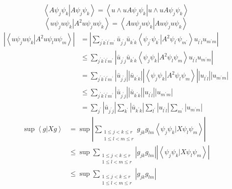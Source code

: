 \documentclass[aps,preprint]{revtex4}%
\begin{document}
\begin{equation}
\left\langle A\psi_{j}\psi_{k}\left\vert A\psi_{j}\psi_{k}\right.
\right\rangle =\left\langle u\wedge uA\psi_{j}\psi_{k}\left\vert u\wedge
uA\psi_{j}\psi_{k}\right.  \right\rangle
\end{equation}%
\begin{equation}
\left\langle u\psi_{j}u\psi_{k}\left\vert A^{2}\right.  u\psi_{j}u\psi
_{k}\right\rangle =\left\langle Au\psi_{j}u\psi_{k}\left\vert Au\psi_{j}%
u\psi_{k}\right.  \right\rangle
\end{equation}%
\begin{align}
\left\vert \left\langle u\psi_{j}u\psi_{k}\left\vert A^{2}\right.  u\psi
_{l}u\psi_{m}\right\rangle \right\vert  &  =\left\vert \sum_{j^{\prime
}k^{\prime}l^{\prime}m^{\prime}}\bar{u}_{j^{\prime}j}\bar{u}_{k^{\prime}%
k}\left\langle \psi_{j^{\prime}}\psi_{k^{\prime}}\left\vert A^{2}\right.
\psi_{l^{\prime}}\psi_{m^{\prime}}\right\rangle u_{l^{\prime}l}u_{m^{\prime}%
m}\right\vert \nonumber\\
&  \leq\sum_{j^{\prime}k^{\prime}l^{\prime}m^{\prime}}\left\vert \bar
{u}_{j^{\prime}j}\bar{u}_{k^{\prime}k}\left\langle \psi_{j}\psi_{k}\left\vert
A^{2}\right.  \psi_{l}\psi_{m}\right\rangle u_{l^{\prime}l}u_{m^{\prime}%
m}\right\vert \nonumber\\
&  =\sum_{j^{\prime}k^{\prime}l^{\prime}m^{\prime}}\left\vert \bar
{u}_{j^{\prime}j}\right\vert \left\vert \bar{u}_{k^{\prime}k}\right\vert
\left\vert \left\langle \psi_{j}\psi_{k}\left\vert A^{2}\right.  \psi_{l}%
\psi_{m}\right\rangle \right\vert \left\vert u_{l^{\prime}l}\right\vert
\left\vert u_{m^{\prime}m}\right\vert \nonumber\\
&  \leq\sum_{j^{\prime}k^{\prime}l^{\prime}m^{\prime}}\left\vert \bar
{u}_{j^{\prime}j}\right\vert \left\vert \bar{u}_{k^{\prime}k}\right\vert
\left\vert u_{l^{\prime}l}\right\vert \left\vert u_{m^{\prime}m}\right\vert
\nonumber\\
&  =\sum_{j^{\prime}}\left\vert \bar{u}_{j^{\prime}j}\right\vert
\sum_{k^{\prime}}\left\vert \bar{u}_{k^{\prime}k}\right\vert \sum_{l^{\prime}%
}\left\vert u_{l^{\prime}l}\right\vert \sum_{m^{\prime}}\left\vert
u_{m^{\prime}m}\right\vert
\end{align}%
\begin{align}
\sup\left\langle g\left\vert X\right.  g\right\rangle  &  =\sup\left\vert
\sum_{\substack{1\leq j<k\leq r\\1\leq l<m\leq r}}g_{jk}g_{lm}\left\langle
\psi_{j}\psi_{k}\left\vert X\right.  \psi_{l}\psi_{m}\right\rangle \right\vert
\nonumber\\
&  \leq\sup\sum_{\substack{1\leq j<k\leq r\\1\leq l<m\leq r}}\left\vert
g_{jk}g_{lm}\right\vert \left\vert \left\langle \psi_{j}\psi_{k}\left\vert
X\right.  \psi_{l}\psi_{m}\right\rangle \right\vert \nonumber\\
&  \leq\sup\sum_{\substack{1\leq j<k\leq r\\1\leq l<m\leq r}}\left\vert
g_{jk}g_{lm}\right\vert
\end{align}
\end{document}
